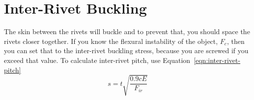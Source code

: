 \documentclass{article}
\begin{document}
\section{Inter-Rivet Buckling}
The skin between the rivets will buckle and to prevent that, you should space the rivets closer together.
If you know the flexural instability of the object, $F_c$, then you can set that to the inter-rivet buckling stress, because you are screwed if you exceed that value.
To calculate inter-rivet pitch, use Equation~\ref{eqn:inter-rivet-pitch}
\begin{equation}\label{eqn:inter-rivet-pitch}
   s = t\sqrt{\frac{0.9cE}{F_{ir}}} 
\end{equation}
\end{document}
